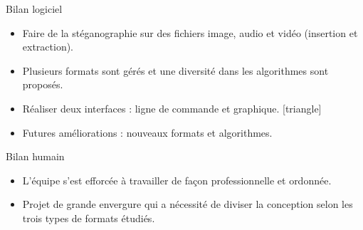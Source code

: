 \documentclass{beamer}
\begin{document}
  
  \begin{frame}
  
	\begin{block}{Bilan logiciel}
	\begin{itemize}
	[circle]
	\item Faire de la stéganographie sur des fichiers image, audio et vidéo
	(insertion et extraction). \checkmark
	\item Plusieurs formats sont gérés et une diversité dans les algorithmes 
	sont proposés. \checkmark
	\item Réaliser deux interfaces : ligne de commande et graphique. \checkmark
{}[triangle]
	\item Futures améliorations : nouveaux formats et algorithmes. 

\end{itemize}
	
	\end{block}
	
	\begin{block}{Bilan humain}
	\begin{itemize}
	[circle]
	\item L'équipe s'est efforcée à travailler de façon professionnelle et ordonnée.
	\item Projet de grande envergure qui a nécessité de diviser la conception 
	selon les trois types de formats étudiés.  
	\end{itemize}
	\end{block}

	\end{frame}
  
\end{document}
